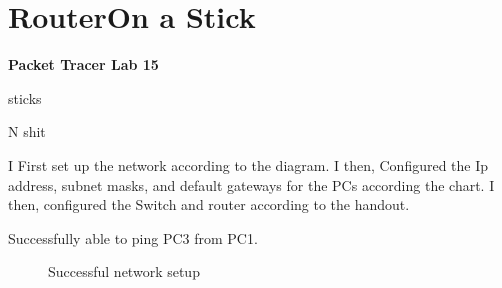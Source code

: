 \documentclass[../EngineeringJournal_CDavis.tex]{subfiles}
\begin{document}

\chapter[Router on a Stick]{Router\linebreak[1] On a Stick \hspace*{\fill March
8, 2020}}
\noindent\textbf{{Packet Tracer Lab 15} }                             


\hspace{0.2cm}
\begin{tcolorbox}[width=6.3in]
\scriptsize 
sticks
  \begin{outline}
    \1 N shit
  \end{outline}
\end{tcolorbox}
\hspace{0.2cm}
\normalsize  
  
\clearpage


I First set up the network according to the diagram.
I then, Configured the Ip address, subnet masks, and default gateways for the
PCs according the chart.
I then, configured the Switch and router according to the handout.

Successfully able to ping PC3 from PC1.


\begin{figure}[!hbt]\centering
{}\par
{}\par
\caption{Successful network setup}
\label{success15}
\end{figure}








\end{document}
